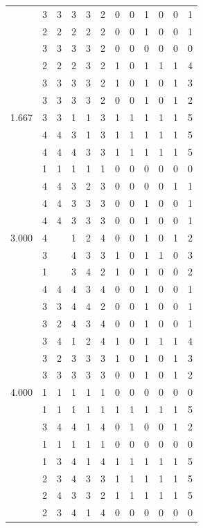 \documentclass[]{msu-thesis}
\theoremstyle{definition}
\theoremstyle{definition}
\theoremstyle{definition}
\theoremstyle{remark}
\begin{document}
\begin{table}
{\begin{tabular}[t]{rrrrrrrrrrrr}
 & 3 & 3 & 3 & 3 & 2 & 0 & 0 & 1 & 0 & 0 & 1\\
 & 2 & 2 & 2 & 2 & 2 & 0 & 0 & 1 & 0 & 0 & 1\\
 & 3 & 3 & 3 & 3 & 2 & 0 & 0 & 0 & 0 & 0 & 0\\
 & 2 & 2 & 2 & 3 & 2 & 1 & 0 & 1 & 1 & 1 & 4\\
 & 3 & 3 & 3 & 3 & 2 & 1 & 0 & 1 & 0 & 1 & 3\\
 & 3 & 3 & 3 & 3 & 2 & 0 & 0 & 1 & 0 & 1 & 2\\
1.667 & 3 & 3 & 1 & 1 & 3 & 1 & 1 & 1 & 1 & 1 & 5\\
 & 4 & 4 & 3 & 1 & 3 & 1 & 1 & 1 & 1 & 1 & 5\\
 & 4 & 4 & 4 & 3 & 3 & 1 & 1 & 1 & 1 & 1 & 5\\
 & 1 & 1 & 1 & 1 & 1 & 0 & 0 & 0 & 0 & 0 & 0\\
 & 4 & 4 & 3 & 2 & 3 & 0 & 0 & 0 & 0 & 1 & 1\\
 & 4 & 4 & 3 & 3 & 3 & 0 & 0 & 1 & 0 & 0 & 1\\
 & 4 & 4 & 3 & 3 & 3 & 0 & 0 & 1 & 0 & 0 & 1\\
3.000 & 4 &  & 1 & 2 & 4 & 0 & 0 & 1 & 0 & 1 & 2\\
 & 3 &  & 4 & 3 & 3 & 1 & 0 & 1 & 1 & 0 & 3\\
 & 1 &  & 3 & 4 & 2 & 1 & 0 & 1 & 0 & 0 & 2\\
 & 4 & 4 & 4 & 3 & 4 & 0 & 0 & 1 & 0 & 0 & 1\\
 & 3 & 3 & 4 & 4 & 2 & 0 & 0 & 1 & 0 & 0 & 1\\
 & 3 & 2 & 4 & 3 & 4 & 0 & 0 & 1 & 0 & 0 & 1\\
 & 3 & 4 & 1 & 2 & 4 & 1 & 0 & 1 & 1 & 1 & 4\\
 & 3 & 2 & 3 & 3 & 3 & 1 & 0 & 1 & 0 & 1 & 3\\
 & 3 & 3 & 3 & 3 & 3 & 0 & 0 & 1 & 0 & 1 & 2\\
4.000 & 1 & 1 & 1 & 1 & 1 & 0 & 0 & 0 & 0 & 0 & 0\\
 & 1 & 1 & 1 & 1 & 1 & 1 & 1 & 1 & 1 & 1 & 5\\
 & 3 & 4 & 4 & 1 & 4 & 0 & 1 & 0 & 0 & 1 & 2\\
 & 1 & 1 & 1 & 1 & 1 & 0 & 0 & 0 & 0 & 0 & 0\\
 & 1 & 3 & 4 & 1 & 4 & 1 & 1 & 1 & 1 & 1 & 5\\
 & 2 & 3 & 4 & 3 & 3 & 1 & 1 & 1 & 1 & 1 & 5\\
 & 2 & 4 & 3 & 3 & 2 & 1 & 1 & 1 & 1 & 1 & 5\\
 & 2 & 3 & 4 & 1 & 4 & 0 & 0 & 0 & 0 & 0 & 0\\

\end{tabular}}
\end{table}
\end{document}
